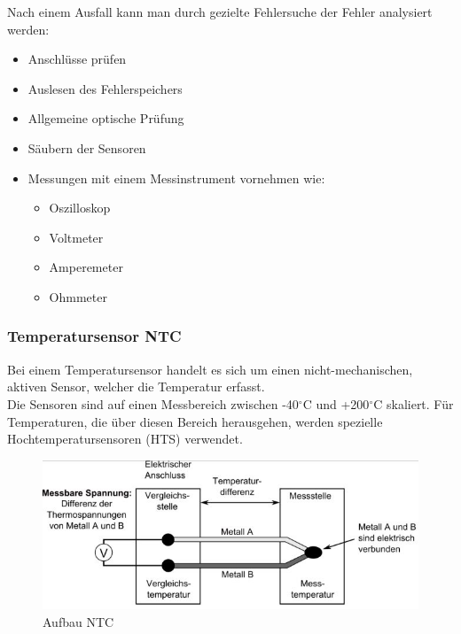         Nach einem Ausfall kann man durch gezielte Fehlersuche der Fehler analysiert werden:

        \begin{itemize}
            \item Anschlüsse prüfen
            \item Auslesen des Fehlerspeichers
            \item Allgemeine optische Prüfung
            \item Säubern der Sensoren
            \item Messungen mit einem Messinstrument vornehmen wie:
            \begin{itemize}
                \item Oszilloskop 
                \item Voltmeter
                \item Amperemeter
                \item Ohmmeter	
            \end{itemize}
            
        \end{itemize}

        \subsubsection{Temperatursensor NTC}
			Bei einem Temperatursensor handelt es sich um einen nicht-mechanischen, aktiven	Sensor, welcher die Temperatur erfasst.\\
            Die Sensoren sind auf einen Messbereich zwischen -40$^\circ$C und +200$^\circ$C skaliert.
            Für Temperaturen, die über diesen Bereich herausgehen, werden spezielle Hochtemperatursensoren (HTS) verwendet.

            \begin{figure}
				\centering
                \includegraphics[width=\textwidth] {aufbau_ntc.png}
                \caption[www.kfztech.de/kfztechnik/elo/sensoren/ntc.htm]{Aufbau NTC}
                \label{fig:TS02}
			\end{figure}

